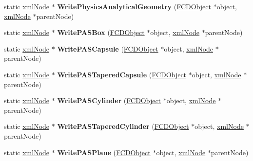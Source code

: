 \begin{DoxyCompactItemize}
\item 
\hypertarget{classFArchiveXML_a04a77356b182ae7b11ceb0555383dd8c}{
static \hyperlink{struct__xmlNode}{xmlNode} $\ast$ {\bfseries WritePhysicsAnalyticalGeometry} (\hyperlink{classFCDObject}{FCDObject} $\ast$object, \hyperlink{struct__xmlNode}{xmlNode} $\ast$parentNode)}
\label{classFArchiveXML_a04a77356b182ae7b11ceb0555383dd8c}

\item 
\hypertarget{classFArchiveXML_aa791278978c08870c5e635223bda7efa}{
static \hyperlink{struct__xmlNode}{xmlNode} $\ast$ {\bfseries WritePASBox} (\hyperlink{classFCDObject}{FCDObject} $\ast$object, \hyperlink{struct__xmlNode}{xmlNode} $\ast$parentNode)}
\label{classFArchiveXML_aa791278978c08870c5e635223bda7efa}

\item 
\hypertarget{classFArchiveXML_a14d67110179c5b47581167ea87fc2561}{
static \hyperlink{struct__xmlNode}{xmlNode} $\ast$ {\bfseries WritePASCapsule} (\hyperlink{classFCDObject}{FCDObject} $\ast$object, \hyperlink{struct__xmlNode}{xmlNode} $\ast$parentNode)}
\label{classFArchiveXML_a14d67110179c5b47581167ea87fc2561}

\item 
\hypertarget{classFArchiveXML_aff6d80d14f259327443234f7c48c5ae2}{
static \hyperlink{struct__xmlNode}{xmlNode} $\ast$ {\bfseries WritePASTaperedCapsule} (\hyperlink{classFCDObject}{FCDObject} $\ast$object, \hyperlink{struct__xmlNode}{xmlNode} $\ast$parentNode)}
\label{classFArchiveXML_aff6d80d14f259327443234f7c48c5ae2}

\item 
\hypertarget{classFArchiveXML_a945d6e1751c201a5eeab8d7e6ba0b2f8}{
static \hyperlink{struct__xmlNode}{xmlNode} $\ast$ {\bfseries WritePASCylinder} (\hyperlink{classFCDObject}{FCDObject} $\ast$object, \hyperlink{struct__xmlNode}{xmlNode} $\ast$parentNode)}
\label{classFArchiveXML_a945d6e1751c201a5eeab8d7e6ba0b2f8}

\item 
\hypertarget{classFArchiveXML_abb256df79c4f773714a3aa4f78dcf4d5}{
static \hyperlink{struct__xmlNode}{xmlNode} $\ast$ {\bfseries WritePASTaperedCylinder} (\hyperlink{classFCDObject}{FCDObject} $\ast$object, \hyperlink{struct__xmlNode}{xmlNode} $\ast$parentNode)}
\label{classFArchiveXML_abb256df79c4f773714a3aa4f78dcf4d5}

\item 
\hypertarget{classFArchiveXML_a0b92ff45f03e4cb17b25037053474ecb}{
static \hyperlink{struct__xmlNode}{xmlNode} $\ast$ {\bfseries WritePASPlane} (\hyperlink{classFCDObject}{FCDObject} $\ast$object, \hyperlink{struct__xmlNode}{xmlNode} $\ast$parentNode)}
\label{classFArchiveXML_a0b92ff45f03e4cb17b25037053474ecb}


\end{DoxyCompactItemize}
